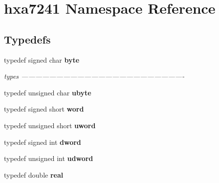 \section{hxa7241 Namespace Reference}
\label{namespacehxa7241}


\subsection*{Typedefs}
\begin{CompactItemize}
\item 
typedef signed char {\bf byte}
\begin{CompactList}\small\item\em types ---------------------------------------------------------------------- \item\end{CompactList}\item 
typedef unsigned char {\bf ubyte}
\item 
typedef signed short {\bf word}
\item 
typedef unsigned short {\bf uword}
\item 
typedef signed int {\bf dword}
\item 
typedef unsigned int {\bf udword}
\item 
typedef double {\bf real}
\end{CompactItemize}

